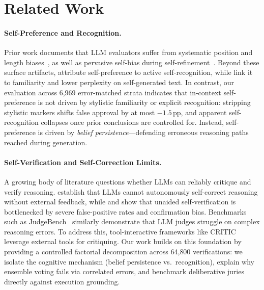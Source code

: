 \section{Related Work}
\label{sec:related}

\paragraph{Self-Preference and Recognition.}
Prior work documents that LLM evaluators suffer from systematic position and length biases~\citep{zheng2023judging,wang2024large}, as well as pervasive self-bias during self-refinement~\citep{xu2024pride}. Beyond these surface artifacts, \citet{panickssery2024llm} attribute self-preference to active self-recognition, while \citet{wataoka2024selfpreference} link it to familiarity and lower perplexity on self-generated text. In contrast, our evaluation across 6{,}969 error-matched strata indicates that in-context self-preference is not driven by stylistic familiarity or explicit recognition: stripping stylistic markers shifts false approval by at most $-1.5$\,pp, and apparent self-recognition collapses once prior conclusions are controlled for. Instead, self-preference is driven by \emph{belief persistence}—defending erroneous reasoning paths reached during generation.

\paragraph{Self-Verification and Self-Correction Limits.}
A growing body of literature questions whether LLMs can reliably critique and verify reasoning. \citet{huang2024selfcorrect} establish that LLMs cannot autonomously self-correct reasoning without external feedback, while \citet{stechly2024evaluating} and \citet{kamoi2024why} show that unaided self-verification is bottlenecked by severe false-positive rates and confirmation bias. Benchmarks such as JudgeBench~\citep{tan2024judgebench} similarly demonstrate that LLM judges struggle on complex reasoning errors. To address this, tool-interactive frameworks like CRITIC~\citep{gou2024critic} leverage external tools for critiquing. Our work builds on this foundation by providing a controlled factorial decomposition across 64{,}800 verifications: we isolate the cognitive mechanism (belief persistence vs.\ recognition), explain why ensemble voting fails via correlated errors, and benchmark deliberative juries directly against execution grounding.

